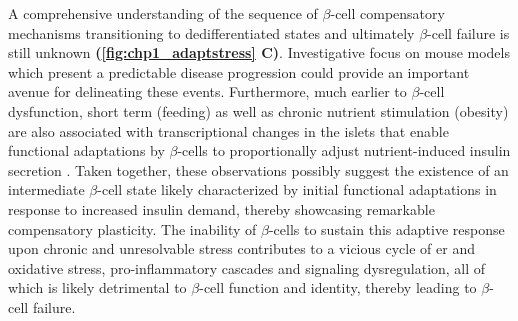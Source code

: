 \par A comprehensive understanding of the sequence of $\beta$-cell compensatory mechanisms transitioning to dedifferentiated states and ultimately $\beta$-cell failure is still unknown \textbf{(\autoref{fig:chp1_adaptstress} C)}. Investigative focus on mouse models which present a predictable disease progression could provide an important avenue for delineating these events. Furthermore, much earlier to $\beta$-cell dysfunction, short term (feeding) as well as chronic nutrient stimulation (obesity) are also associated with transcriptional changes in the islets that enable functional adaptations by $\beta$-cells to proportionally adjust nutrient-induced insulin secretion \textbf{\cite{wortham_nutrient_2023}}. Taken together, these observations possibly suggest the existence of an intermediate $\beta$-cell state likely characterized by initial functional adaptations in response to increased insulin demand, thereby showcasing remarkable compensatory plasticity. The inability of $\beta$-cells to sustain this adaptive response upon chronic and unresolvable stress contributes to a vicious cycle of \gls{er} and oxidative stress, pro-inflammatory cascades and signaling dysregulation, all of which is likely detrimental to $\beta$-cell function and identity, thereby leading to $\beta$-cell failure.\\











